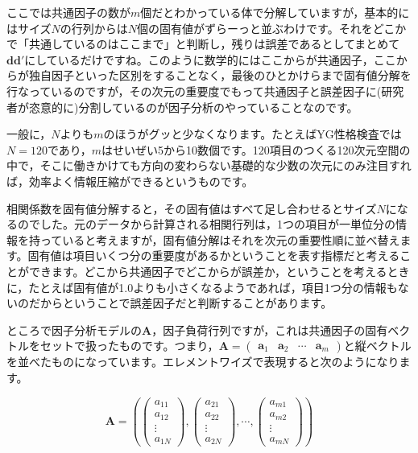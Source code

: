 \documentclass{ltjsbook}
\begin{document}
ここでは共通因子の数が$m$個だとわかっている体で分解していますが，基本的にはサイズ$N$の行列からは$N$個の固有値がずらーっと並ぶわけです。それをどこかで「共通しているのはここまで」と判断し，残りは誤差であるとしてまとめて$\bm{dd'}$にしているだけですね。このように数学的にはここからが共通因子，ここからが独自因子といった区別をすることなく，最後のひとかけらまで固有値分解を行なっているのですが，その次元の重要度でもって共通因子と誤差因子に(研究者が恣意的に)分割しているのが因子分析のやっていることなのです。

一般に，$N$よりも$m$のほうがグッと少なくなります。たとえばYG性格検査では$N=120$であり，$m$はせいぜい5から10数個です。120項目のつくる120次元空間の中で，そこに働きかけても方向の変わらない基礎的な少数の次元にのみ注目すれば，効率よく情報圧縮ができるというものです。

相関係数を固有値分解すると，その固有値はすべて足し合わせるとサイズ$N$になるのでした。元のデータから計算される相関行列は，1つの項目が一単位分の情報を持っていると考えますが，固有値分解はそれを次元の重要性順に並べ替えます。固有値は項目いくつ分の重要度があるかということを表す指標だと考えることができます。どこから共通因子でどこからが誤差か，ということを考えるときに，たとえば固有値が1.0よりも小さくなるようであれば，項目1つ分の情報もないのだからということで誤差因子だと判断することがあります。

ところで因子分析モデルの$\bm{A}$，因子負荷行列ですが，これは共通因子の固有ベクトルをセットで扱ったものです。つまり，$\bm{A} = \begin{pmatrix}\bm{a}_1 & \bm{a}_2 & \cdots& \bm{a}_m \end{pmatrix}$と縦ベクトルを並べたものになっています。エレメントワイズで表現すると次のようになります。

\[
    \bm{A} = \left (
    \begin{pmatrix}  a_{11}\\a_{12}\\\vdots\\ a_{1N} \end{pmatrix},
    \begin{pmatrix}  a_{21}\\a_{22}\\\vdots\\ a_{2N} \end{pmatrix},
    \cdots,
    \begin{pmatrix}  a_{m1}\\a_{m2}\\\vdots\\ a_{mN} \end{pmatrix}
    \right )
\]
\end{document}
